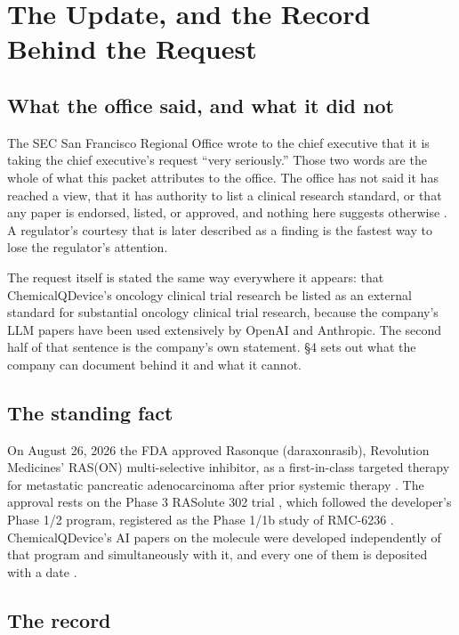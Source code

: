 \section{The Update, and the Record Behind the Request}

\subsection{What the office said, and what it did not}

The SEC San Francisco Regional Office wrote to the chief executive that it is
taking the chief executive's request ``very seriously.'' Those two words are the whole of what this
packet attributes to the office. The office has not said it has reached a view,
that it has authority to list a clinical research standard, or that any paper is
endorsed, listed, or approved, and nothing here suggests otherwise
\cite{secsf2026}. A regulator's courtesy that is later described as a finding is
the fastest way to lose the regulator's attention.

The request itself is stated the same way everywhere it appears: that
ChemicalQDevice's oncology clinical trial research be listed as an external
standard for substantial oncology clinical trial research, because the company's
LLM papers have been used extensively by OpenAI and Anthropic. The second half of
that sentence is the company's own statement. \S4 sets out what the company can
document behind it and what it cannot.

\subsection{The standing fact}

On August 26, 2026 the FDA approved Rasonque (daraxonrasib), Revolution
Medicines' RAS(ON) multi-selective inhibitor, as a first-in-class targeted
therapy for metastatic pancreatic adenocarcinoma after prior systemic therapy
\cite{fdarasonque2026,fdadisco2026,revmedapproval2026}. The approval rests on the
Phase 3 RASolute 302 trial \cite{ctgov302,rasolute302}, which followed the
developer's Phase 1/2 program, registered as the Phase 1/1b study of RMC-6236
\cite{ctgov001}. ChemicalQDevice's AI papers on the molecule were developed
independently of that program and simultaneously with it, and every one of them
is deposited with a date \cite{daraxstory2026}.

\subsection{The record}

